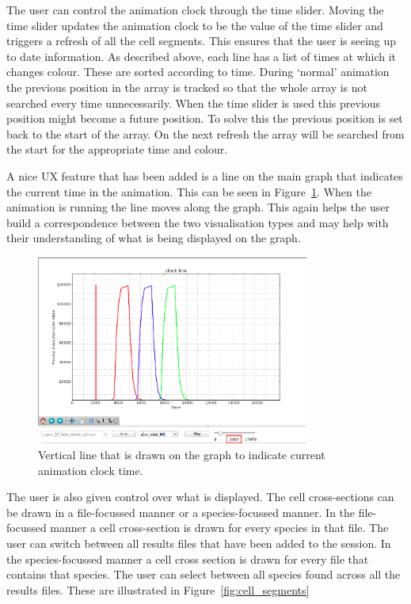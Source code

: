 The user can control the animation clock through the time slider.  Moving the time slider updates the animation clock to be the value of the time slider and triggers a refresh of all the cell segments. This ensures that the user is seeing up to date information.   As described above, each line has a list of times at which it changes colour.  These are sorted according to time.  During `normal' animation the previous position in the array is tracked so that the whole array is not searched every time unnecessarily.  When the time slider is used this previous position might become a future position.  To solve this the previous position is set back to the start of the array.  On the next refresh the array will be searched from the start for the appropriate time and colour.

A nice \ac{UX} feature that has been added is a line on the main graph that indicates the current time in the animation. This can be seen in Figure~\ref{fig:animation_clock}.  When the animation is running the line moves along the graph.  This again helps the user build a correspondence between the two visualisation types and may help with their understanding of what is being displayed on the graph.

\begin{figure}[h!]
    \centering
    \includegraphics[width=0.8\textwidth]{images/animation_clock_line.png}
    \caption{Vertical line that is drawn on the graph to indicate current animation clock time.}
    \label{fig:animation_clock}
\end{figure}

The user is also given control over what is displayed.  The cell cross-sections can be drawn in a file-focussed manner or a species-focussed manner.  In the file-focussed manner a cell cross-section is drawn for every species in that file.  The user can switch between all results files that have been added to the session.  In the species-focussed manner a cell cross section is drawn for every file that contains that species.  The user can select between all species found across all the results files.  These are illustrated in Figure~\ref{fig:cell_segments}

